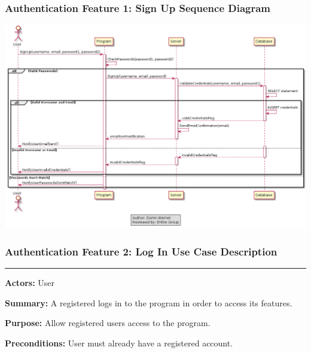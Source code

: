 \documentclass[twoside,letterpaper]{article}
\begin{document}
\subsubsection[Authentication Feature 1: Sign Up Sequence Diagram]{\rmfamily\bfseries\color{black}
	Authentication Feature 1: Sign Up Sequence Diagram}
\hypertarget{RefHeading22059017292}{}

\bigskip

\includegraphics[width=\textwidth]{images/SequenceDiagrams/AuthenticationSignUp}

\newpage

\subsubsection[Authentication Feature 2: Log In Use Case Description]{\rmfamily\bfseries\color{black}
	Authentication Feature 2: Log In Use Case Description}
\hypertarget{RefHeading22059017292}{}

\hrule
\vspace{8pt}
\noindent\textbf{Actors:} User \newline

\noindent\textbf{Summary:} A registered logs in to the program in order to access its features.  \newline

\noindent\textbf{Purpose:} Allow registered users access to the program.  \newline

\noindent\textbf{Preconditions:} User must already have a registered account.  \newline
\end{document}
